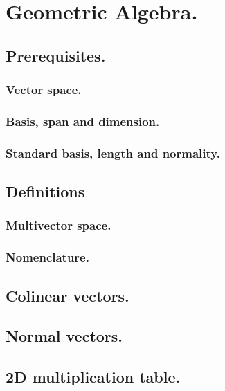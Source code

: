 %
%
\chapter{Geometric Algebra.}
   \section{Prerequisites.}
      
      \subsection{Vector space.}
         
         
         
      \subsection{Basis, span and dimension.}
         
      \subsection{Standard basis, length and normality.}
         
   \section{Definitions}
      \subsection{Multivector space.}
         
      \subsection{Nomenclature.}
         
   \section{Colinear vectors.}
      
   \section{Normal vectors.}
      
   \section{2D multiplication table.}
      
